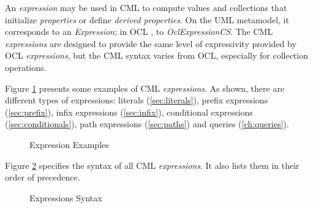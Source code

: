 \begin{definition}
An \emph{expression} may be used in CML to compute values and collections that initialize \emph{properties} or define \emph{derived properties}.
On the UML \cite{uml} metamodel,
it corresponds to an \emph{Expression};
in OCL \cite{ocl}, to \emph{OclExpressionCS}.
The CML \emph{expressions} are designed to provide the same level of
expressivity provided by OCL \emph{expressions},
but the CML syntax varies from OCL, especially for collection operations.
\end{definition}

\begin{examples}
Figure \ref{fig:ex:expressions} presents some examples of CML \emph{expressions}.
As shown, there are different types of expressions:
literals (\ref{sec:literals}),
prefix expressions (\ref{sec:prefix}),
infix expressions (\ref{sec:infix}),
conditional expressions (\ref{sec:conditionals}),
path expressions (\ref{sec:paths})
and queries (\ref{ch:queries}).
\end{examples}

\begin{figure}
\verbatimfont{\small}
\begin{framed}

\end{framed}
\caption{Expression Examples}
\label{fig:ex:expressions}
\end{figure}

\begin{concrete-syntax}
Figure \ref{fig:stx:expressions} specifies the syntax of all CML \emph{expressions}. It also lists them in their order of precedence.
\end{concrete-syntax}

\begin{figure}
\verbatimfont{\small}
\begin{framed}

\end{framed}
\caption{Expressions Syntax}
\label{fig:stx:expressions}
\end{figure}
